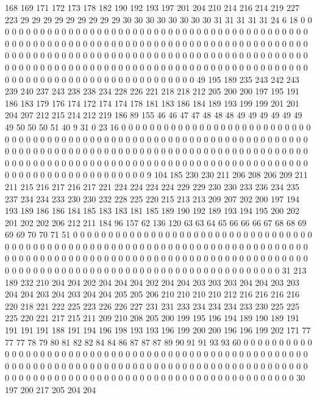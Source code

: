 168 169 171 172 173 178 182 190 192 193 197 201 204 210 214 216 214 219 227 223
29 29 29 29 29 29 29 29 29 30 30 30 30 30 30 30 30 31 31 31
31 31 24 6 18 0 0 0 0 0 0 0 0 0 0 0 0 0 0 0
0 0 0 0 0 0 0 0 0 0 0 0 0 0 0 0 0 0 0 0
0 0 0 0 0 0 0 0 0 0 0 0 0 0 0 0 0 0 0 0
0 0 0 0 0 0 0 0 0 0 0 0 0 0 0 0 0 0 0 0
0 0 0 0 0 0 0 0 0 0 0 0 0 0 0 0 0 0 0 0
0 0 0 0 0 0 0 0 0 0 0 0 0 0 0 0 0 0 0 0
0 0 0 0 0 0 0 0 0 0 0 0 0 0 0 0 0 0 0 0
0 0 0 0 0 0 0 0 0 0 0 0 0 0 0 0 0 0 0 0
0 0 0 0 0 0 0 0 0 0 0 0 0 0 0 0 0 0 0 0
0 0 0 0 0 0 0 0 0 0 0 0 0 0 0 0 0 0 0 0
0 0 0 0 0 0 49 195 189 235 243 242 243 239 240 237 243 238 238 234
228 226 221 218 218 212 205 200 200 197 195 191 186 183 179 176 174 172 174 174
178 181 183 186 184 189 193 199 199 201 201 204 207 212 215 214 212 219 186 89
155 46 46 47 47 48 48 48 49 49 49 49 49 49 49 50 50 50 51 40
9 31 0 23 16 0 0 0 0 0 0 0 0 0 0 0 0 0 0 0
0 0 0 0 0 0 0 0 0 0 0 0 0 0 0 0 0 0 0 0
0 0 0 0 0 0 0 0 0 0 0 0 0 0 0 0 0 0 0 0
0 0 0 0 0 0 0 0 0 0 0 0 0 0 0 0 0 0 0 0
0 0 0 0 0 0 0 0 0 0 0 0 0 0 0 0 0 0 0 0
0 0 0 0 0 0 0 0 0 0 0 0 0 0 0 0 0 0 0 0
0 0 0 0 0 0 0 0 0 0 0 0 0 0 0 0 0 0 0 0
0 0 0 0 0 0 0 0 0 0 0 0 0 0 0 0 0 0 0 0
0 0 0 0 0 0 0 0 0 0 0 0 0 0 0 0 0 0 0 0
0 9 104 185 230 230 211 206 208 206 209 211 211 215 216 217 216 217 221 224
224 224 224 229 229 230 230 233 236 234 235 237 234 234 233 230 230 232 228 225
220 215 213 213 209 207 202 200 197 194 193 189 186 186 184 185 183 183 181 185
189 190 192 189 193 194 195 200 202 201 202 202 206 212 211 184 96 157 62 136
120 63 63 64 65 66 66 66 67 68 68 69 69 69 70 70 71 51 0 0
0 0 0 0 0 0 0 0 0 0 0 0 0 0 0 0 0 0 0 0
0 0 0 0 0 0 0 0 0 0 0 0 0 0 0 0 0 0 0 0
0 0 0 0 0 0 0 0 0 0 0 0 0 0 0 0 0 0 0 0
0 0 0 0 0 0 0 0 0 0 0 0 0 0 0 0 0 0 0 0
0 0 0 0 0 0 0 0 0 0 0 0 0 0 0 0 0 0 0 0
0 0 0 0 0 0 0 0 0 0 0 0 0 0 0 0 0 0 0 0
0 0 0 0 0 0 0 0 0 0 0 0 0 0 0 0 0 0 0 0
0 0 0 0 0 0 0 0 0 0 0 0 0 0 0 0 0 31 213 189
232 210 204 204 202 204 204 204 202 204 204 203 203 203 204 204 203 203 204 204
203 204 203 204 204 205 205 206 210 210 210 210 212 216 216 216 216 220 218 221
222 225 223 226 226 227 231 231 233 234 234 234 233 230 225 225 225 220 221 217
215 211 209 210 208 205 200 199 195 196 194 189 190 189 191 191 191 191 188 191
194 196 198 193 193 196 199 200 200 196 196 199 202 171 77 77 77 78 79 80
81 82 82 84 84 86 87 87 87 89 90 91 91 93 93 60 0 0 0 0
0 0 0 0 0 0 0 0 0 0 0 0 0 0 0 0 0 0 0 0
0 0 0 0 0 0 0 0 0 0 0 0 0 0 0 0 0 0 0 0
0 0 0 0 0 0 0 0 0 0 0 0 0 0 0 0 0 0 0 0
0 0 0 0 0 0 0 0 0 0 0 0 0 0 0 0 0 0 0 0
0 0 0 0 0 0 0 0 0 0 0 0 0 0 0 0 0 0 0 0
0 0 0 0 0 0 0 0 0 0 0 0 0 0 0 0 0 0 0 0
0 0 0 0 0 0 0 0 0 0 0 0 0 30 197 200 217 205 204 204

